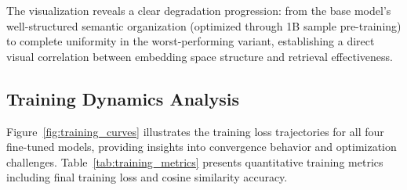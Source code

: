 \documentclass[conference]{IEEEtran}
\begin{document}
The visualization reveals a clear degradation progression: from the base model's well-structured semantic organization (optimized through 1B sample pre-training) to complete uniformity in the worst-performing variant, establishing a direct visual correlation between embedding space structure and retrieval effectiveness.

\subsection{Training Dynamics Analysis}
Figure~\ref{fig:training_curves} illustrates the training loss trajectories for all four fine-tuned models, providing insights into convergence behavior and optimization challenges. Table~\ref{tab:training_metrics} presents quantitative training metrics including final training loss and cosine similarity accuracy.
\end{document}

